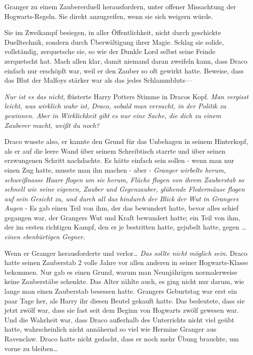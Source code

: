 {Granger zu einem Zaubererduell herausfordern, unter offener Missachtung der Hogwarts-Regeln. Sie direkt anzugreifen, wenn sie sich weigern würde.

Sie im Zweikampf besiegen, in aller Öffentlichkeit, nicht durch geschickte Duelltechnik, sondern durch Überwältigung ihrer Magie. Schlag sie solide, vollständig, zerquetsche sie, so wie der Dunkle Lord selbst seine Feinde zerquetscht hat. Mach allen klar, damit niemand daran zweifeln kann, dass Draco einfach nur erschöpft war, weil er den Zauber so oft gewirkt hatte. Beweise, dass das Blut der Malfoys stärker war als das jedes Schlammbluts—

\emph{Nur ist es das nicht}, flüsterte Harry Potters Stimme in Dracos Kopf. \emph{Man vergisst leicht, was wirklich wahr ist, Draco, sobald man versucht, in der Politik zu gewinnen. Aber in Wirklichkeit gibt es nur eine Sache, die dich zu einem Zauberer macht, weißt du noch?}

Draco wusste also, er kannte den Grund für das Unbehagen in seinem Hinterkopf, als er auf die leere Wand über seinem Schreibtisch starrte und über seinen erzwungenen Schritt nachdachte. Es hätte einfach sein sollen - wenn man nur einen Zug hatte, musste man ihn machen - aber - \emph{Granger wirbelte herum, schweißnasse Haare flogen um sie herum, Flüche flogen von ihrem Zauberstab so schnell wie seine eigenen, Zauber und Gegenzauber, glühende Fledermäuse flogen auf sein Gesicht zu, und durch all das hindurch der Blick der Wut in Grangers Augen} - Es gab einen Teil von ihm, der das bewundert hatte, bevor alles schief gegangen war, der Grangers Wut und Kraft bewundert hatte; ein Teil von ihm, der im ersten richtigen Kampf, den er je bestritten hatte, gejubelt hatte, gegen \emph{… einen ebenbürtigen Gegner.}

Wenn er Granger herausforderte und verlor… \emph{Das sollte nicht möglich sein}. Draco hatte seinen Zauberstab 2 volle Jahre vor allen anderen in seiner Hogwarts-Klasse bekommen. Nur gab es einen Grund, warum man Neunjährigen normalerweise keine Zauberstäbe schenkte. Das Alter zählte auch, es ging nicht nur darum, wie lange man einen Zauberstab besessen hatte. Grangers Geburtstag war erst ein paar Tage her, als Harry ihr diesen Beutel gekauft hatte. Das bedeutete, dass sie jetzt zwölf war, dass sie fast seit dem Beginn von Hogwarts zwölf gewesen war. Und die Wahrheit war, dass Draco außerhalb des Unterrichts nicht viel geübt hatte, wahrscheinlich nicht annähernd so viel wie Hermine Granger aus Ravenclaw. Draco hatte nicht gedacht, dass er noch mehr Übung brauchte, um vorne zu bleiben…

}
